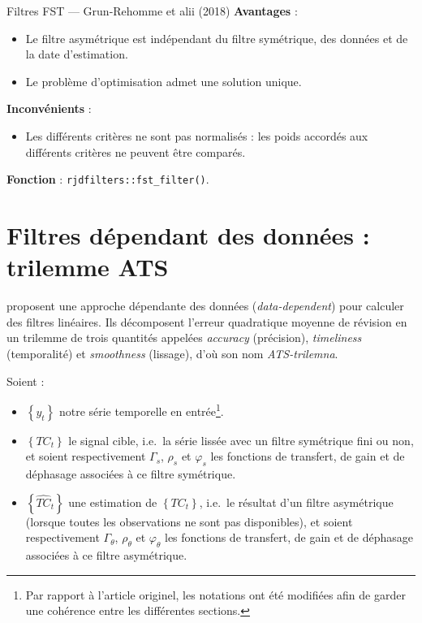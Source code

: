 \documentclass[
  12pt,
  a4paper,french]{article}
\providecommand{\tightlist}{%
  \setlength{\itemsep}{0pt}\setlength{\parskip}{0pt}}
\newcommand\1{\mathds{1}}
\begin{document}
\begin{summary_box}{Filtres FST --- Grun-Rehomme et alii (2018)}
\textbf{Avantages} :

\begin{itemize}
\item
  Le filtre asymétrique est indépendant du filtre symétrique, des données et de la date d'estimation.
\item
  Le problème d'optimisation admet une solution unique.
\end{itemize}

\textbf{Inconvénients} :

\begin{itemize}
\tightlist
\item
  Les différents critères ne sont pas normalisés : les poids accordés aux différents critères ne peuvent être comparés.
\end{itemize}

\textbf{Fonction } : \texttt{rjdfilters::fst\_filter()}.

\end{summary_box}

\hypertarget{sec-WildiMcLeroy}{%
\section{Filtres dépendant des données : trilemme ATS}\label{sec-WildiMcLeroy}}

\textcite{trilemmaWMR2019} proposent une approche dépendante des données (\emph{data-dependent}) pour calculer des filtres linéaires.
Ils décomposent l'erreur quadratique moyenne de révision en un trilemme de trois quantités appelées \emph{accuracy} (précision), \emph{timeliness} (temporalité) et \emph{smoothness} (lissage), d'où son nom \emph{ATS-trilemna}.

Soient :

\begin{itemize}
\item
  \(\left\{ y_{t}\right\}\) notre série temporelle en entrée\footnote{
    Par rapport à l'article originel, les notations ont été modifiées afin de garder une cohérence entre les différentes sections.}.
\item
  \(\left\{TC_{t}\right\}\) le signal cible, i.e.~la série lissée avec un filtre symétrique fini ou non, et soient respectivement \(\Gamma_s\), \(\rho_s\) et \(\varphi_s\) les fonctions de transfert, de gain et de déphasage associées à ce filtre symétrique.
\item
  \(\left\{\widehat{TC}_{t}\right\}\) une estimation de \(\left\{TC_{t}\right\}\), i.e.~le résultat d'un filtre asymétrique (lorsque toutes les observations ne sont pas disponibles), et soient respectivement \(\Gamma_\theta\), \(\rho_\theta\) et \(\varphi_\theta\) les fonctions de transfert, de gain et de déphasage associées à ce filtre asymétrique.
\end{itemize}
\end{document}
